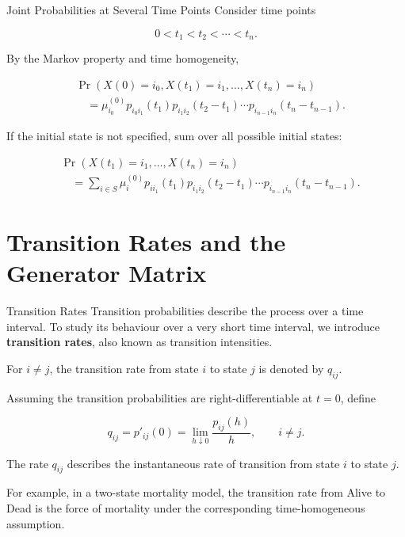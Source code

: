\documentclass[
  ignorenonframetext,
  aspectratio=169,
]{beamer}
\begin{document}
\begin{frame}{Joint Probabilities at Several Time Points}
\protect{}\label{joint-probabilities-at-several-time-points}
Consider time points

\[
0<t_1<t_2<\cdots<t_n.
\]

By the Markov property and time homogeneity,

\[
\begin{aligned}
&\Pr(X(0)=i_0,X(t_1)=i_1,\ldots,X(t_n)=i_n)\\
&\quad=
\mu_{i_0}^{(0)}
p_{i_0i_1}(t_1)
p_{i_1i_2}(t_2-t_1)
\cdots
p_{i_{n-1}i_n}(t_n-t_{n-1}).
\end{aligned}
\]

If the initial state is not specified, sum over all possible initial
states:

\[
\begin{aligned}
&\Pr(X(t_1)=i_1,\ldots,X(t_n)=i_n)\\
&\quad=
\sum_{i\in S}
\mu_i^{(0)}
p_{ii_1}(t_1)
p_{i_1i_2}(t_2-t_1)
\cdots
p_{i_{n-1}i_n}(t_n-t_{n-1}).
\end{aligned}
\]
\end{frame}

\section{Transition Rates and the Generator
Matrix}\label{transition-rates-and-the-generator-matrix}

\begin{frame}{Transition Rates}
\protect{}\label{transition-rates}
Transition probabilities describe the process over a time interval. To
study its behaviour over a very short time interval, we introduce
\textbf{transition rates}, also known as transition intensities.

For \(i\neq j\), the transition rate from state \(i\) to state \(j\) is
denoted by \(q_{ij}\).

Assuming the transition probabilities are right-differentiable at
\(t=0\), define

\[
\boxed{
q_{ij}
=
p'_{ij}(0)
=
\lim_{h\downarrow 0}
\frac{p_{ij}(h)}{h},
\qquad i\neq j.
}
\]

The rate \(q_{ij}\) describes the instantaneous rate of transition from
state \(i\) to state \(j\).

For example, in a two-state mortality model, the transition rate from
Alive to Dead is the force of mortality under the corresponding
time-homogeneous assumption.
\end{frame}
\end{document}
